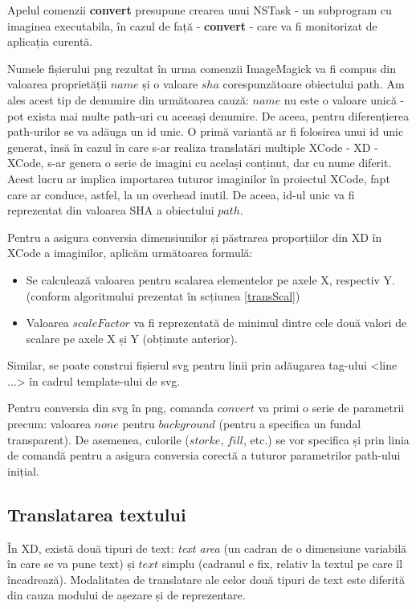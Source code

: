 Apelul comenzii \textbf{convert} presupune crearea unui NSTask - un subprogram cu imaginea executabila, în cazul de față - \textbf{convert} - care va fi monitorizat de aplicația curentă. 

Numele fișierului png rezultat în urma comenzii ImageMagick va fi compus din valoarea proprietății $name$ și o valoare $sha$ corespunzătoare obiectului path. Am ales acest tip de denumire din următoarea cauză: $name$ nu este o valoare unică - pot exista mai multe path-uri cu aceeași denumire. De aceea, pentru diferențierea path-urilor se va adăuga un id unic. O primă variantă ar fi folosirea unui id unic generat, însă în cazul în care s-ar realiza translatări multiple XCode - XD - XCode, s-ar genera o serie de imagini cu același conținut, dar cu nume diferit. Acest lucru ar implica importarea tuturor imaginilor în proiectul XCode, fapt care ar conduce, astfel, la un overhead inutil. De aceea, id-ul unic va fi reprezentat din valoarea SHA a obiectului $path$.

Pentru a asigura conversia dimensiunilor și păstrarea proporțiilor din XD în XCode a imaginilor, aplicăm următoarea formulă:

\begin{itemize}  
\item Se calculează valoarea pentru scalarea elementelor pe axele X, respectiv Y. (conform algoritmului prezentat în scțiunea \ref{transScal})
\item Valoarea $scaleFactor$ va fi reprezentată de minimul dintre cele două valori de scalare pe axele X și Y (obținute anterior).
\end{itemize}

Similar, se poate construi fișierul svg pentru linii prin adăugarea tag-ului <line ...> în cadrul template-ului de svg.

Pentru conversia din svg în png, comanda $convert$ va primi o serie de parametrii precum: valoarea $none$ pentru $background$ (pentru a specifica un fundal transparent). De asemenea, culorile ($storke$, $fill$, etc.) se vor specifica și prin linia de comandă pentru a asigura conversia corectă a tuturor parametrilor path-ului inițial.

\subsection{Translatarea textului}

În XD, există două tipuri de text: \textit{text area} (un cadran de o dimensiune variabilă în care se va pune text) și $text$ simplu (cadranul e fix, relativ la textul pe care îl încadrează). Modalitatea de translatare ale celor două tipuri de text este diferită din cauza modului de așezare și de reprezentare. 

